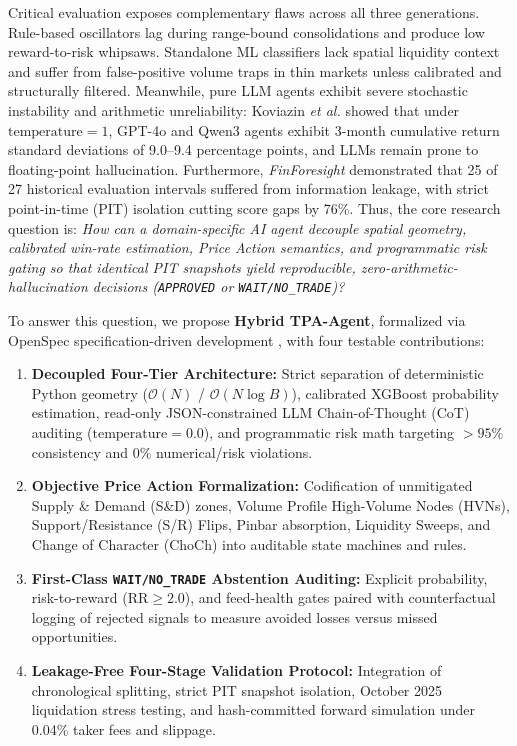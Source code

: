 \documentclass[conference]{IEEEtran}
\begin{document}
Critical evaluation exposes complementary flaws across all three generations. Rule-based oscillators lag during range-bound consolidations and produce low reward-to-risk whipsaws. Standalone ML classifiers lack spatial liquidity context and suffer from false-positive volume traps in thin markets unless calibrated and structurally filtered. Meanwhile, pure LLM agents exhibit severe stochastic instability and arithmetic unreliability: Koviazin \textit{et al.} \cite{koviazin2026} showed that under $\text{temperature}=1$, GPT-4o and Qwen3 agents exhibit 3-month cumulative return standard deviations of 9.0--9.4 percentage points, and LLMs remain prone to floating-point hallucination. Furthermore, \textit{FinForesight} \cite{finforesight2026} demonstrated that 25 of 27 historical evaluation intervals suffered from information leakage, with strict point-in-time (PIT) isolation cutting score gaps by 76\%. Thus, the core research question is: \textit{How can a domain-specific AI agent decouple spatial geometry, calibrated win-rate estimation, Price Action semantics, and programmatic risk gating so that identical PIT snapshots yield reproducible, zero-arithmetic-hallucination decisions (\texttt{APPROVED} or \texttt{WAIT/NO\_TRADE})?}

To answer this question, we propose \textbf{Hybrid TPA-Agent}, formalized via OpenSpec specification-driven development \cite{fission2026openspec}, with four testable contributions:
\begin{enumerate}
    \item \textbf{Decoupled Four-Tier Architecture:} Strict separation of deterministic Python geometry ($\mathcal{O}(N)$ / $\mathcal{O}(N\log B)$), calibrated XGBoost probability estimation, read-only JSON-constrained LLM Chain-of-Thought (CoT) auditing ($\text{temperature}=0.0$), and programmatic risk math targeting $>95\%$ consistency and $0\%$ numerical/risk violations.
    \item \textbf{Objective Price Action Formalization:} Codification of unmitigated Supply \& Demand (S\&D) zones, Volume Profile High-Volume Nodes (HVNs), Support/Resistance (S/R) Flips, Pinbar absorption, Liquidity Sweeps, and Change of Character (ChoCh) into auditable state machines and rules.
    \item \textbf{First-Class \texttt{WAIT/NO\_TRADE} Abstention Auditing:} Explicit probability, risk-to-reward ($\mathrm{RR} \ge 2.0$), and feed-health gates paired with counterfactual logging of rejected signals to measure avoided losses versus missed opportunities.
    \item \textbf{Leakage-Free Four-Stage Validation Protocol:} Integration of chronological splitting, strict PIT snapshot isolation, October 2025 liquidation stress testing, and hash-committed forward simulation under 0.04\% taker fees and slippage.
\end{enumerate}
\end{document}
